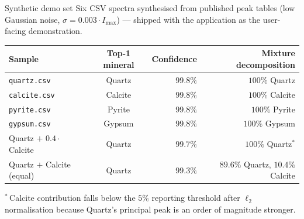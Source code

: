 \documentclass[10pt,aspectratio=169,xcolor=dvipsnames]{beamer}
\begin{document}
\begin{frame}{Synthetic demo set}
  Six CSV spectra synthesised from published peak tables (low Gaussian noise,
  $\sigma = 0.003 \cdot I_{\max}$) — shipped with the application as the
  user-facing demonstration.
  \medskip

  \begin{table}\centering\small
    \begin{tabular}{@{}lcrr@{}}
      \toprule
      \textbf{Sample} & \textbf{Top-1 mineral} &
        \textbf{Confidence} & \textbf{Mixture decomposition}\\
      \midrule
      \texttt{quartz.csv}                  & Quartz  & $99.8\%$ & $100\%$ Quartz \\
      \texttt{calcite.csv}                 & Calcite & $99.8\%$ & $100\%$ Calcite \\
      \texttt{pyrite.csv}                  & Pyrite  & $99.8\%$ & $100\%$ Pyrite \\
      \texttt{gypsum.csv}                  & Gypsum  & $99.8\%$ & $100\%$ Gypsum \\
      Quartz $+$ $0.4\!\cdot\!$Calcite     & Quartz  & $99.7\%$ & $100\%$ Quartz$^{*}$ \\
      Quartz $+$ Calcite (equal)           & Quartz  & $99.3\%$ & $89.6\%$ Quartz, $10.4\%$ Calcite \\
      \bottomrule
    \end{tabular}
  \end{table}
  \medskip
  \footnotesize $^{*}$\,Calcite contribution falls below the $5\%$ reporting
  threshold after $\ell_2$ normalisation because Quartz's principal peak is
  an order of magnitude stronger.
\end{frame}
\end{document}
